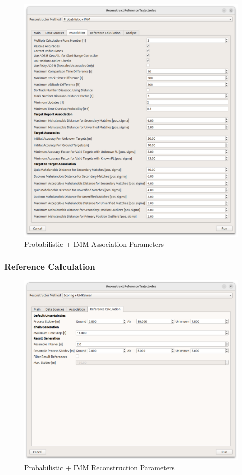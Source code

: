 \begin{figure}[H]
    \center
      \includegraphics[width=16cm]{figures/dialog_probimm_assoc.png}
    \caption{Probabilistic + IMM Association Parameters}
\end{figure}

\subsubsection{Reference Calculation}

\begin{figure}[H]
    \center
      \includegraphics[width=16cm]{figures/dialog_ref_calc.png}
    \caption{Probabilistic + IMM Reconstruction Parameters}
\end{figure}

